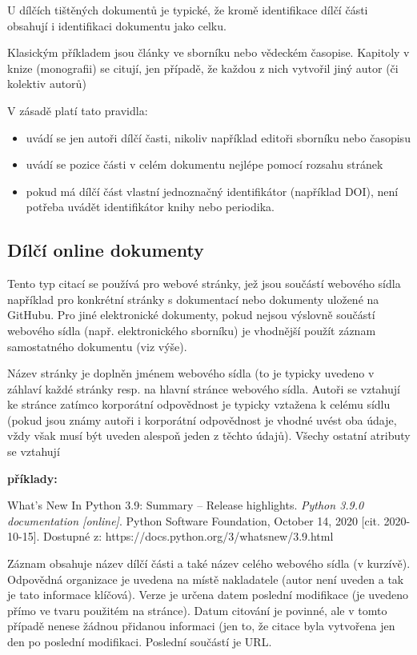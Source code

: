 \documentclass[male,czech,api_bc]{kitheses}
\begin{document}
U dílčích tištěných dokumentů je typické, že kromě identifikace dílčí části obsahují i identifikaci dokumentu jako celku.

Klasickým příkladem jsou články ve sborníku nebo vědeckém časopise. Kapitoly v knize (monografii) se citují, jen případě, že každou z nich vytvořil jiný autor (či kolektiv autorů)

V zásadě platí tato pravidla:

\begin{itemize}
\item uvádí se jen autoři dílčí časti, nikoliv například editoři sborníku nebo časopisu
\item uvádí se pozice části v celém dokumentu nejlépe pomocí rozsahu stránek
\item pokud má dílčí část vlastní jednoznačný identifikátor (například DOI), není potřeba uvádět identifikátor knihy nebo periodika.
\end{itemize}


\subsection{Dílčí online dokumenty}

Tento typ citací se používá pro webové stránky, jež jsou součástí webového sídla například pro
konkrétní stránky s dokumentací nebo dokumenty uložené na GitHubu. Pro jiné elektronické dokumenty, pokud nejsou výslovně součástí webového sídla (např. elektronického sborníku) je vhodnější použít 
záznam samostatného dokumentu (viz výše).

Název stránky je doplněn jménem webového sídla (to je typicky uvedeno v záhlaví každé stránky resp. na hlavní stránce webového sídla. Autoři se vztahují ke stránce zatímco korporátní odpovědnost je typicky vztažena k celému sídlu (pokud jsou známy autoři i korporátní odpovědnost je vhodné uvést oba údaje, vždy však musí být uveden alespoň jeden z těchto údajů). Všechy ostatní atributy se vztahují 

\textbf{příklady:}

What’s New In Python 3.9: Summary – Release highlights. \textit{Python 3.9.0 documentation [online]}. Python Software Foundation, October 14, 2020 [cit. 2020-10-15]. Dostupné z: https://docs.python.org/3/whatsnew/3.9.html

Záznam obsahuje název dílčí části a také název celého webového sídla (v kurzívě). Odpovědná organizace je uvedena na místě nakladatele (autor není uveden a tak je tato informace klíčová). Verze je určena datem poslední modifikace (je uvedeno přímo ve tvaru použitém na stránce). Datum citování je povinné, ale v tomto případě nenese žádnou přidanou informaci (jen to, že citace byla vytvořena jen den po poslední modifikaci. Poslední součástí je URL.
\end{document}
